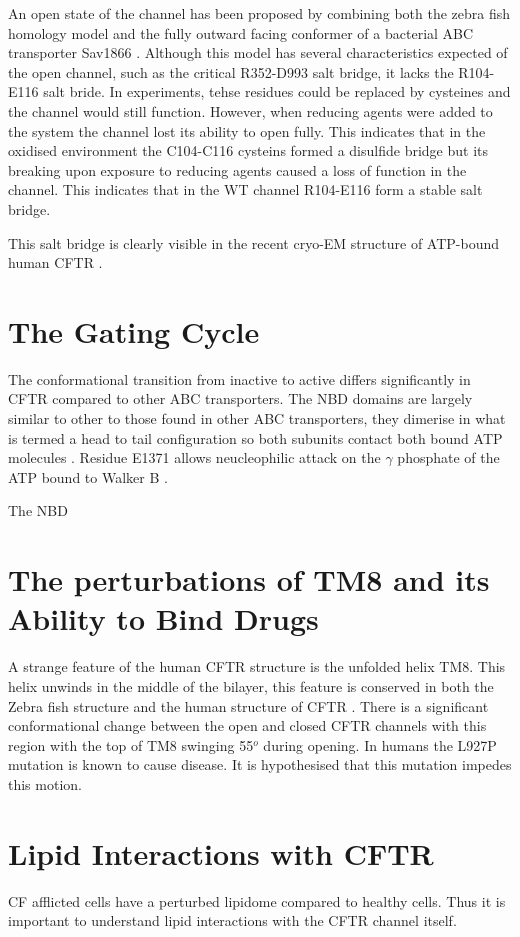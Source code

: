 An open state of the channel has been proposed by combining both the zebra fish homology model and the fully outward facing conformer of a bacterial ABC transporter Sav1866 \cite{Hoffman2018}. Although this model has several characteristics expected of the open channel, such as the critical R352-D993 salt bridge, it lacks the R104-E116 salt bride. In experiments, tehse residues could be replaced by cysteines and the channel would still function. However, when reducing agents were added to the system the channel lost its ability to open fully. This indicates that in the oxidised environment the C104-C116 cysteins formed a disulfide bridge but its breaking upon exposure to reducing agents caused a loss of function in the channel. This indicates that in the WT channel R104-E116 form a stable salt bridge. 

This salt bridge is clearly visible in the recent cryo-EM structure of ATP-bound human CFTR \cite{Zhang2018}.

\section{The Gating Cycle}
The conformational transition from inactive to active differs significantly in CFTR compared to other ABC transporters. The NBD domains are largely similar to other to those found in other ABC transporters, they dimerise in what is termed a head to tail configuration so both subunits contact both bound ATP molecules \cite{}. Residue E1371 allows neucleophilic attack on the $\gamma$ phosphate of the ATP bound to Walker B \cite{Stratford2007}. 

The NBD 

\section{The perturbations of TM8 and its Ability to Bind Drugs}
A strange feature of the human CFTR structure is the unfolded helix TM8. This helix unwinds in the middle of the bilayer, this feature is conserved in both the Zebra fish structure and the human structure of CFTR \cite{Zhang2017}\cite{Zhang2018}. There is a significant conformational change between the open and closed CFTR channels with this region with the top of TM8 swinging 55$^o$ during opening. In humans the L927P mutation is known to cause disease. It is hypothesised that this mutation impedes this motion.



\section{Lipid Interactions with CFTR}
CF afflicted cells have a perturbed lipidome compared to healthy cells.\cite{Cottrill2020} Thus it is important to understand lipid interactions with the CFTR channel itself.
